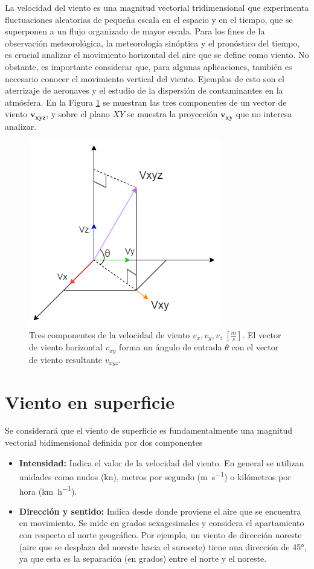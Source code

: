 La velocidad del viento es una magnitud vectorial tridimensional que experimenta fluctuaciones aleatorias de pequeña escala en el espacio y en el tiempo, que se superponen a un flujo organizado de mayor escala. Para los fines de la observación meteorológica, la meteorología sinóptica y el pronóstico del tiempo, es crucial analizar el movimiento horizontal del aire que se define como viento. No obstante, es importante considerar que, para algunas aplicaciones, también es necesario conocer el movimiento vertical del viento. Ejemplos de esto son el aterrizaje de aeronaves y el estudio de la dispersión de contaminantes en la atmósfera. En la Figura \ref{fig:vectorVelocidad} se muestran las tres componentes de un vector de viento $\mathbf{v_{xyz}}$, y sobre el plano $XY$ se muestra la proyección $\mathbf{v_{xy}}$ que no interesa analizar.

\begin{figure}[H]
    \centering
    \includegraphics[width=0.5\linewidth]{Figuras/introduccion/vectorVelocidad.png}
    \caption{Tres componentes de la velocidad de viento $v_{x}, v_{y}, v_{z}\  [\frac{m}{s}]$. El vector de viento horizontal $v_{xy}$ forma un ángulo de entrada $\theta$ con el vector de viento resultante $v_{xyz}$.} 
    \label{fig:vectorVelocidad}
\end{figure}

\section{Viento en superficie}\label{sec:vientoEnSuperficie}
Se considerará que el viento de superficie es fundamentalmente una magnitud vectorial bidimensional definida por dos componentes
\begin{itemize}
    \item \textbf{Intensidad:} Indica el valor de la velocidad del viento. En general se utilizan unidades como nudos (\unit{\knot}), metros por segundo (\unit{\meter\per\second}) o kilómetros por hora (\unit{\kilo\meter\per\hour}).
    \item \textbf{Dirección y sentido:} Indica desde donde proviene el aire que se encuentra en movimiento. Se mide en grados sexagesimales y considera el apartamiento con respecto al norte geográfico. Por ejemplo, un viento de dirección noreste (aire que se desplaza del noreste hacia el suroeste) tiene una dirección de 45°, ya que esta es la separación (en grados) entre el norte y el noreste.
\end{itemize}

